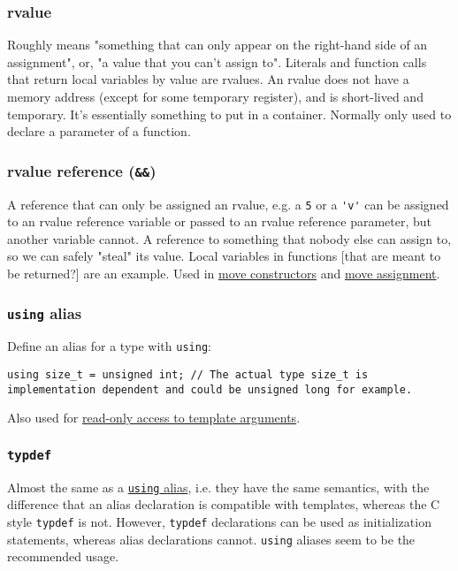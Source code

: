 \documentclass[8pt, table, xcdraw]{article}%
\begin{document}
\subsubsection{rvalue}

Roughly means "something that can only appear on the right-hand side of an assignment", or, "a value that you can't assign to". Literals and function calls that return local variables by value are rvalues. An rvalue does not have a memory address (except for some temporary register), and is short-lived and temporary. It's essentially something to put in a container. Normally only used to declare a parameter of a function.

\subsubsection{rvalue reference (\lstinline{&&})} \label{rvaluereference}

A reference that can only be assigned an rvalue, e.g. a \lstinline{5} or a \lstinline{'v'} can be assigned to an rvalue reference variable or passed to an rvalue reference parameter, but another variable cannot. A reference to something that nobody else can assign to, so we can safely "steal" its value. Local variables in functions [that are meant to be returned?] are an example. Used in \hyperref[moveconstructor]{move constructors} and \hyperref[moveassignment]{move assignment}.

\subsubsection{\lstinline{using} alias} \label{alias}

Define an alias for a type with \lstinline{using}:

\begin{lstlisting}
using size_t = unsigned int; // The actual type size_t is implementation dependent and could be unsigned long for example.
\end{lstlisting}

Also used for \hyperref[readonlyaccesstotemplatearguments]{read-only access to template arguments}.

\subsubsection{\lstinline{typdef}} \label{typedef}

Almost the same as a \hyperref[alias]{\lstinline{using} alias}, i.e. they have the same semantics, with the difference that an alias declaration is compatible with templates, whereas the C style \lstinline{typdef} is not. However, \lstinline{typdef} declarations can be used as initialization statements, whereas alias declarations cannot. \lstinline{using} aliases seem to be the recommended usage.
\end{document}
